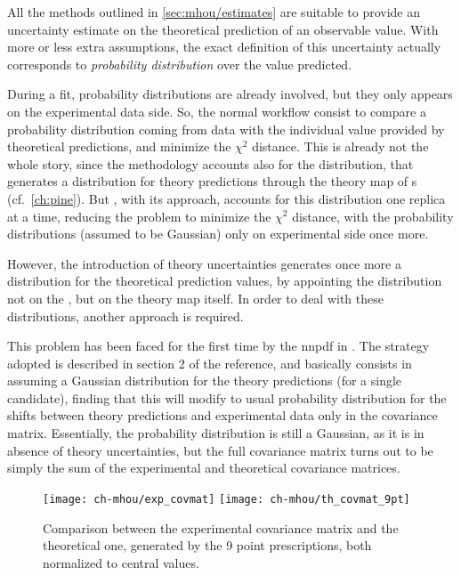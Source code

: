 
All the methods outlined in \cref{sec:mhou/estimates} are suitable to provide
an uncertainty estimate on the theoretical prediction of an observable value.
With more or less extra assumptions, the exact definition of this uncertainty
actually corresponds to \textit{probability distribution} over the value
predicted.

During a \pdf fit, probability distributions are already involved, but they
only appears on the experimental data side.
So, the normal workflow consist to compare a probability distribution coming
from data with the individual value provided by theoretical predictions, and
minimize the $\chi^2$ distance.
%
This is already not the whole story, since the \nnpdf methodology accounts also
for the \pdf distribution, that generates a distribution for theory predictions
through the theory map of \fktab{}s (cf.\ \cref{ch:pine}).
%
But \nnpdf, with its \mc approach, accounts for this distribution one \pdf
replica at a time, reducing the problem to minimize the $\chi^2$ distance, with
the probability distributions (assumed to be Gaussian) only on experimental
side once more.

However, the introduction of theory uncertainties generates once more a
distribution for the theoretical prediction values, by appointing the
distribution not on the \pdf, but on the theory map itself.
%
In order to deal with these distributions, another approach is required.

This problem has been faced for the first time by the \acrlong{nnpdf} in
\cite{NNPDF:2019ubu}.
%
The strategy adopted is described in section 2 of the reference, and basically
consists in assuming a Gaussian distribution for the theory predictions (for a
single \pdf candidate), finding that this will modify to usual probability
distribution for the shifts between theory predictions and experimental data
only in the covariance matrix.
%
Essentially, the probability distribution is still a Gaussian, as it is in
absence of theory uncertainties, but the full covariance matrix turns out to be
simply the sum of the experimental and theoretical covariance matrices.

\begin{figure}
	\centering
	\texttt{[image: ch-mhou/exp\_covmat]}
	\texttt{[image: ch-mhou/th\_covmat\_9pt]}
	\caption{
		Comparison between the experimental covariance matrix and the
		theoretical one, generated by the 9 point prescriptions, both
		normalized to central values.
	}
	\label{fig:mhou/covmats}
\end{figure}

